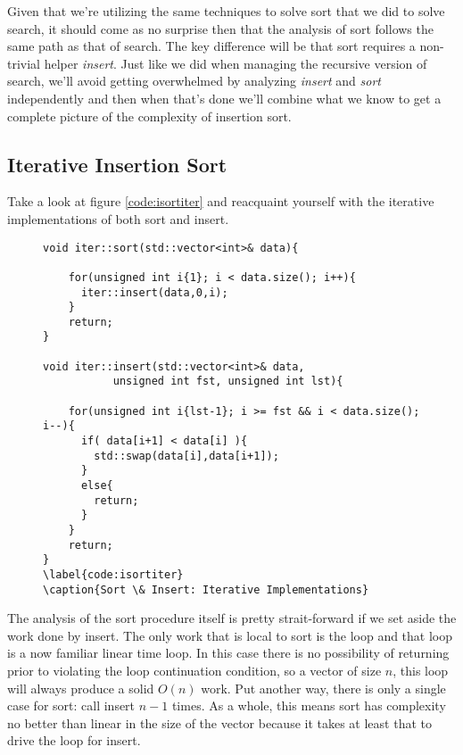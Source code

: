 \documentclass[]{tufte-handout}
\begin{document}
Given that we're utilizing the same techniques to solve sort that we did to solve search, it should come as no surprise then that the analysis of sort follows the same path as that of search. The key difference will be that sort requires a non-trivial helper \textit{insert}. Just like we did when managing the recursive version of search, we'll avoid getting overwhelmed by analyzing \textit{insert} and \textit{sort} independently and then when that's done we'll combine what we know to get a complete picture of the complexity of insertion sort. 

\subsection{Iterative Insertion Sort}

Take a look at figure \ref{code:isortiter} and reacquaint yourself with the iterative implementations of both sort and insert.
\begin{figure}
\begin{lstlisting}
void iter::sort(std::vector<int>& data){

    for(unsigned int i{1}; i < data.size(); i++){
      iter::insert(data,0,i);
    }
    return;
}

void iter::insert(std::vector<int>& data,
		   unsigned int fst, unsigned int lst){

    for(unsigned int i{lst-1}; i >= fst && i < data.size(); i--){
      if( data[i+1] < data[i] ){
		std::swap(data[i],data[i+1]);
      }
      else{
		return;
      }
    }
    return;
}
\label{code:isortiter}
\caption{Sort \& Insert: Iterative Implementations}
\end{lstlisting}
\end{figure}

The analysis of the sort procedure itself is pretty strait-forward if we set aside the work done by insert. The only work that is local to sort is the loop and that loop is a now familiar linear time loop. In this case there is no possibility of returning prior to violating the loop continuation condition, so a vector of size $n$, this loop will always produce a solid $O(n)$ work. Put another way, there is only a single case for sort: call insert $n-1$ times. As a whole, this means sort has complexity no better than linear in the size of the vector because it takes at least that to drive the loop for insert. 
\end{document}
